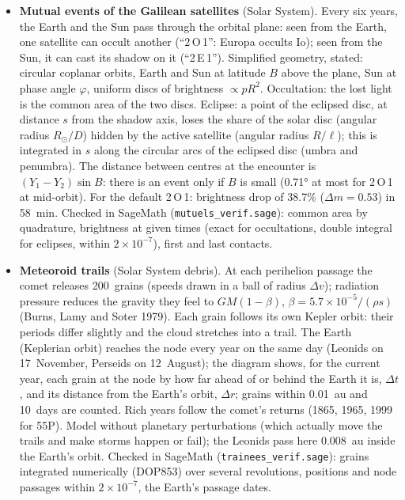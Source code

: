 \begin{itemize}
$A=14.3''$ per year: $\varpi$ goes round in 90,367~years, $\omega$ in 45,183~years, next crossing around the year
22,494; (3200) Phaethon crosses around 2641. Limits stated in the animation: linear theory (order of magnitude for
large $e$), terrestrial planets left out (they actually speed the precession up). Checked in SageMath
(\texttt{seculaire\_verif.sage}): Laplace coefficients by integration and by the hypergeometric series, crossing
epochs, MOID by an independent minimisation (to $10^{-7}$~au), and a direct Sun-Jupiter integration over 3,000~years
whose rates of $\varpi$ and $\Omega$ recover $\pm A$ within 0.2\%.
\item \textbf{Mutual events of the Galilean satellites} (Solar System). Every six years, the Earth and the Sun pass
through the orbital plane: seen from the Earth, one satellite can occult another (“2\,O\,1”: Europa occults Io); seen
from the Sun, it can cast its shadow on it (“2\,E\,1”). Simplified geometry, stated: circular coplanar orbits, Earth and
Sun at latitude $B$ above the plane, Sun at phase angle $\varphi$, uniform discs of brightness $\propto pR^2$.
Occultation: the lost light is the common area of the two discs. Eclipse: a point of the eclipsed disc, at distance
$s$ from the shadow axis, loses the share of the solar disc (angular radius $R_\odot/D$) hidden by the active
satellite (angular radius $R/\ell$); this is integrated in $s$ along the circular arcs of the eclipsed disc (umbra
and penumbra). The distance between centres at the encounter is $(Y_1-Y_2)\sin B$: there is an event only if $B$ is
small (0.71° at most for 2\,O\,1 at mid-orbit). For the default 2\,O\,1: brightness drop of 38.7\% ($\Delta m=0.53$)
in 58~min. Checked in SageMath (\texttt{mutuels\_verif.sage}): common area by quadrature, brightness at given times
(exact for occultations, double integral for eclipses, within $2\times10^{-7}$), first and last contacts.
\item \textbf{Meteoroid trails} (Solar System debris). At each perihelion passage the comet releases 200~grains
(speeds drawn in a ball of radius $\Delta v$); radiation pressure reduces the gravity they feel to $GM(1-\beta)$,
$\beta=5.7\times10^{-5}/(\rho s)$ (Burns, Lamy and Soter 1979). Each grain follows its own Kepler orbit: their periods
differ slightly and the cloud stretches into a trail. The Earth (Keplerian orbit) reaches the node every year on the
same day (Leonids on 17~November, Perseids on 12~August); the diagram shows, for the current year, each grain at the
node by how far ahead of or behind the Earth it is, $\Delta t$, and its distance from the Earth's orbit, $\Delta r$;
grains within 0.01~au and 10~days are counted. Rich years follow the comet's returns (1865, 1965, 1999 for 55P).
Model without planetary perturbations (which actually move the trails and make storms happen or fail); the Leonids
pass here 0.008~au inside the Earth's orbit. Checked in SageMath (\texttt{trainees\_verif.sage}): grains integrated
numerically (DOP853) over several revolutions, positions and node passages within $2\times10^{-7}$, the Earth's
passage dates.
\end{itemize}


